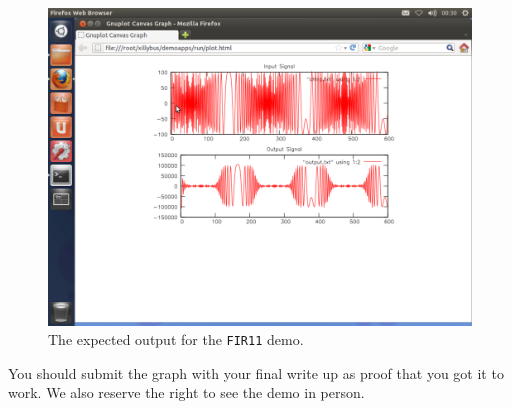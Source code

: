\begin{figure}
\centering
%
\includegraphics[width=5.5in]{images/zillybus_fir_demo}
\caption{The expected output for the \texttt{FIR11} demo.}\label{fig:zillybus_fir_demo}
\end{figure}

You should submit the graph with your final write up as proof that you got it to work. We also reserve the right to see the demo in person.

